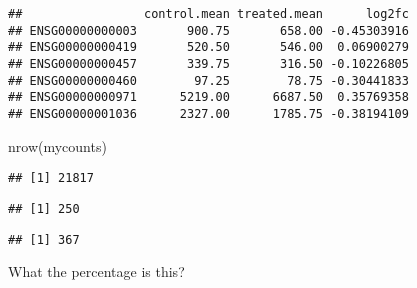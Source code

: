 \documentclass[
]{article}
\newenvironment{Shaded}{\begin{snugshade}}{\end{snugshade}}
\newcommand{\DecValTok}[1]{\textcolor[rgb]{0.00,0.00,0.81}{#1}}
\newcommand{\FunctionTok}[1]{\textcolor[rgb]{0.00,0.00,0.00}{#1}}
\newcommand{\NormalTok}[1]{#1}
\newcommand{\OtherTok}[1]{\textcolor[rgb]{0.56,0.35,0.01}{#1}}
\newcommand{\SpecialCharTok}[1]{\textcolor[rgb]{0.00,0.00,0.00}{#1}}
\begin{document}
\begin{verbatim}
##                 control.mean treated.mean      log2fc
## ENSG00000000003       900.75       658.00 -0.45303916
## ENSG00000000419       520.50       546.00  0.06900279
## ENSG00000000457       339.75       316.50 -0.10226805
## ENSG00000000460        97.25        78.75 -0.30441833
## ENSG00000000971      5219.00      6687.50  0.35769358
## ENSG00000001036      2327.00      1785.75 -0.38194109
\end{verbatim}

\begin{Shaded}
\begin{Highlighting}[]
\FunctionTok{nrow}\NormalTok{(mycounts)}
\end{Highlighting}
\end{Shaded}

\begin{verbatim}
## [1] 21817
\end{verbatim}

\begin{Shaded}
\end{Shaded}

\begin{verbatim}
## [1] 250
\end{verbatim}

\begin{Shaded}
\end{Shaded}

\begin{verbatim}
## [1] 367
\end{verbatim}

What the percentage is this?

\begin{Shaded}
\end{Shaded}
\end{document}
